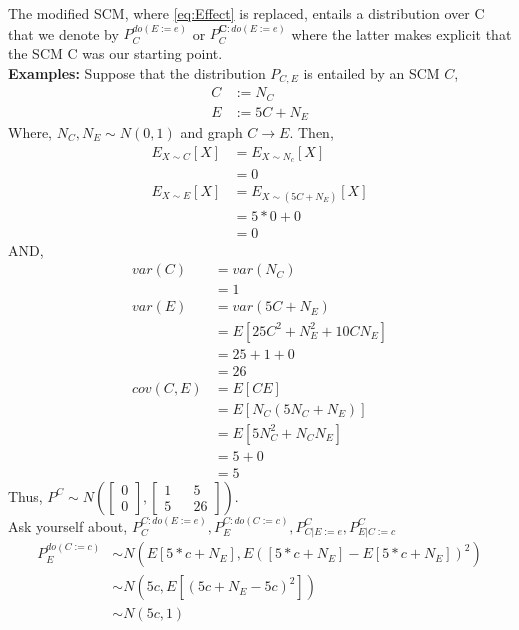 \documentclass{article}
\begin{document}
    The modified SCM, where \cref{eq:Effect} is replaced, entails a distribution over C that we denote by $P_{C}^{do(E:=e)}$ or $P_{C}^{\mathbf{C}:do(E:=e)}$ where the latter makes explicit that the SCM C was our starting point.\\
    \textbf{Examples:}
    Suppose that the distribution $P_{C,E}$ is entailed by an SCM $C$,
    \begin{align*}
        C&:=N_{C}\\
        E&:=5C+N_{E}
    \end{align*}
    Where, $N_{C},N_{E}\sim N(0,1)$ and graph $C \rightarrow E$. Then,
    \begin{align*}
        E_{X\sim C}[X]&= E_{X\sim N_c}[X]\\
        &=0\\
        E_{X\sim E}[X] &= E_{X \sim (5C+N_{E})}[X]\\
        &=5*0+0\\
        &=0
    \end{align*}
    AND,
    \begin{align*}
        var(C)&=var(N_{C})\\
        &=1\\
        var(E)&=var(5C+N_{E})\\
        &=E[25C^2+N_E^2+10CN_{E}]\\
        &=25+1+0\\
        &=26\\
        cov(C,E)&=E[CE]\\
        &=E[N_{C}(5N_{C}+N_E)]\\
        &=E[5N_{C}^2+N_{C}N_{E}]\\
        &=5+0\\
        &=5
    \end{align*}
    Thus, $P^C \sim N\left (\begin{bmatrix}
        0 \\
        0
    \end{bmatrix},\begin{bmatrix}
        1 && 5\\
        5 && 26
    \end{bmatrix}\right )$.\\
    Ask yourself about, $P_{C}^{C:do(E:=e)},P_{E}^{C:do(C:=c)},P_{C|E:=e}^{C},P^{C}_{E|C:=c}$
    \begin{align*}
        P_{E}^{do(C:=c)} &\sim N(E[5*c+N_{E}],E([5*c+N_{E}]-E[5*c+N_{E}])^2)\\
        &\sim N(5c,E[(5c+N_E-5c)^2])\\
        &\sim N(5c,1)
    \end{align*}
\end{document}
